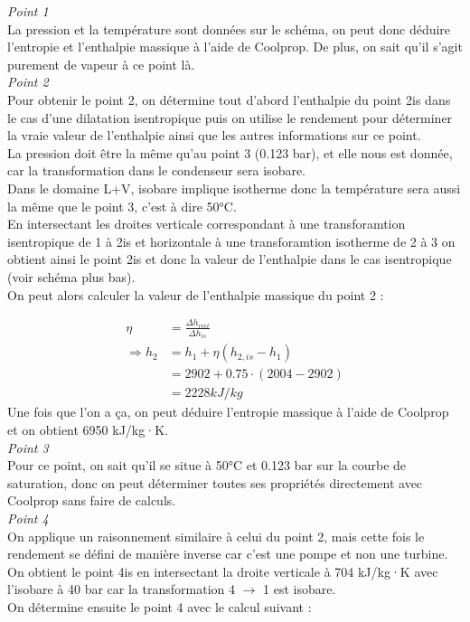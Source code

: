 \documentclass[12pt]{article}
\begin{document}
\textit{Point 1}
\\
La pression et la température sont données sur le schéma, on peut donc déduire l'entropie et l'enthalpie massique à l'aide de Coolprop.
De plus, on sait qu'il s'agit purement de vapeur à ce point là.
\\

\textit{Point 2}
\\
Pour obtenir le point 2, on détermine tout d'abord l'enthalpie du point 2is dans le cas d'une dilatation isentropique puis on utilise le rendement pour déterminer la vraie valeur de l'enthalpie ainsi que les autres informations sur ce point.
\\
La pression doit être la même qu'au point 3 (0.123 bar), et elle nous est donnée, car la transformation dans le condenseur sera isobare.
\\
Dans le domaine L+V, isobare implique isotherme donc la température sera aussi la même que le point 3, c'est à dire 50°C.
\\
En intersectant les droites verticale correspondant à une transforamtion isentropique de 1 à 2is et horizontale à une transforamtion isotherme de 2 à 3 on obtient ainsi le point 2is et donc la valeur de l'enthalpie dans le cas isentropique (voir schéma plus bas).
\\
On peut alors calculer la valeur de l'enthalpie massique du point 2 :

\begin{align*}
\eta &= \frac{\Delta h_{reel}}{\Delta h_{is}} \\
\Rightarrow h_2 &= h_1 + \eta(h_{2,is}-h_1) \\
&= 2902 + 0.75\cdot(2004-2902) \\
&= 2228 kJ/kg
\end{align*}
Une fois que l'on a ça, on peut déduire l'entropie massique à l'aide de Coolprop et on obtient 6950 kJ/kg·K.
\\

\textit{Point 3}
\\
Pour ce point, on sait qu'il se situe à 50°C et 0.123 bar sur la courbe de saturation, donc on peut déterminer toutes ses propriétés directement avec Coolprop sans faire de calculs.
\\

\textit{Point 4}
\\
On applique un raisonnement similaire à celui du point 2, mais cette fois le rendement se défini de manière inverse car c'est une pompe et non une turbine.
\\
On obtient le point 4is en intersectant la droite verticale à 704 kJ/kg·K avec l'isobare à 40 bar car la transformation 4 $\rightarrow$ 1 est isobare.
\\
On détermine ensuite le point 4 avec le calcul suivant :
\end{document}
